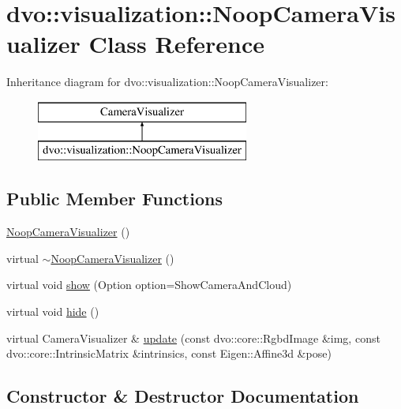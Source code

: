 \hypertarget{classdvo_1_1visualization_1_1_noop_camera_visualizer}{}\section{dvo\+:\+:visualization\+:\+:Noop\+Camera\+Visualizer Class Reference}
\label{classdvo_1_1visualization_1_1_noop_camera_visualizer}
Inheritance diagram for dvo\+:\+:visualization\+:\+:Noop\+Camera\+Visualizer\+:\begin{figure}[H]
\begin{center}
\leavevmode
\includegraphics[height=2.000000cm]{classdvo_1_1visualization_1_1_noop_camera_visualizer}
\end{center}
\end{figure}
\subsection*{Public Member Functions}
\begin{DoxyCompactItemize}
\item 
\mbox{\hyperlink{classdvo_1_1visualization_1_1_noop_camera_visualizer_ade3cb140e752ade11e25f0ad049958af}{Noop\+Camera\+Visualizer}} ()
\item 
virtual \mbox{\hyperlink{classdvo_1_1visualization_1_1_noop_camera_visualizer_ae29e589ff8c183b11c1d2ac8e6072447}{$\sim$\+Noop\+Camera\+Visualizer}} ()
\item 
virtual void \mbox{\hyperlink{classdvo_1_1visualization_1_1_noop_camera_visualizer_acfb97efacfcb9e3dd30444e34c7bfd9c}{show}} (Option option=Show\+Camera\+And\+Cloud)
\item 
virtual void \mbox{\hyperlink{classdvo_1_1visualization_1_1_noop_camera_visualizer_a875ff591e3db513ddbec48478989639e}{hide}} ()
\item 
virtual Camera\+Visualizer \& \mbox{\hyperlink{classdvo_1_1visualization_1_1_noop_camera_visualizer_a7983d8de9de45c5617c3e877d36d6ff3}{update}} (const dvo\+::core\+::\+Rgbd\+Image \&img, const dvo\+::core\+::\+Intrinsic\+Matrix \&intrinsics, const Eigen\+::\+Affine3d \&pose)
\end{DoxyCompactItemize}


\subsection{Constructor \& Destructor Documentation}
\mbox{\label{classdvo_1_1visualization_1_1_noop_camera_visualizer_ade3cb140e752ade11e25f0ad049958af}} 
